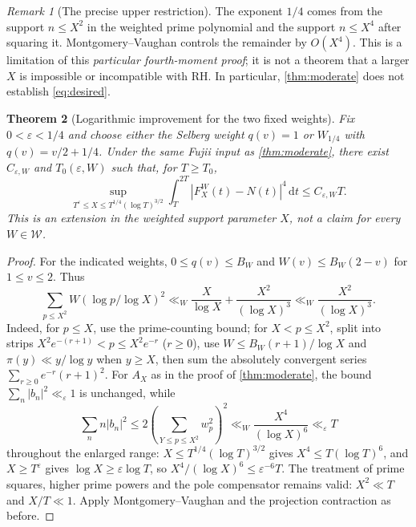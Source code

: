\documentclass[11pt,a4paper]{article}
\numberwithin{equation}{section}
\newtheorem{theorem}{Theorem}[section]
\theoremstyle{definition}
\theoremstyle{remark}
\newtheorem{remark}[theorem]{Remark}
\newcommand{\dd}{\,\mathrm dt}
\begin{document}
\begin{remark}[The precise upper restriction]\label{rem:quarter}
The exponent $1/4$ comes from the support $n\le X^2$ in the weighted prime polynomial and the support $n\le X^4$ after squaring it. Montgomery--Vaughan controls the remainder by $O(X^4)$. This is a limitation of this \emph{particular fourth-moment proof}; it is not a theorem that a larger $X$ is impossible or incompatible with RH. In particular, \cref{thm:moderate} does not establish \eqref{eq:desired}.
\end{remark}

\begin{theorem}[Logarithmic improvement for the two fixed weights]\label{thm:moderate-log}
Fix $0<\varepsilon<1/4$ and choose either the Selberg weight $q(v)=1$
or $W_{1/4}$ with $q(v)=v/2+1/4$. Under the same Fujii input as
\cref{thm:moderate}, there exist $C_{\varepsilon,W}$ and $T_0(\varepsilon,W)$ such that, for $T\ge T_0$,
\begin{equation}\label{eq:moderate-log}
\sup_{T^\varepsilon\le X\le T^{1/4}(\log T)^{3/2}}
\int_T^{2T}|F_X^W(t)-N(t)|^4\dd\le C_{\varepsilon,W}T.
\end{equation}
This is an extension in the \emph{weighted support parameter} $X$,
not a claim for every $W\in\mathcal W$.
\end{theorem}
\begin{proof}
For the indicated weights, $0\le q(v)\le B_W$ and
$W(v)\le B_W(2-v)$ for $1\le v\le2$. Thus
\begin{equation}\label{eq:wprime2}
\sum_{p\le X^2}W(\log p/\log X)^2
\ll_W\frac{X}{\log X}+\frac{X^2}{(\log X)^3}
\ll_W\frac{X^2}{(\log X)^3}.
\end{equation}
Indeed, for $p\le X$, use the prime-counting bound;
for $X<p\le X^2$, split into strips
$X^2e^{-(r+1)}<p\le X^2e^{-r}$ ($r\ge0$),
use $W\le B_W(r+1)/\log X$ and
$\pi(y)\ll y/\log y$ when $y\ge X$,
then sum the absolutely convergent series
$\sum_{r\ge0}e^{-r}(r+1)^2$.
For $A_X$ as in the proof of \cref{thm:moderate}, the bound
$\sum_n|b_n|^2\ll_\varepsilon1$ is unchanged, while
\begin{equation}
\sum_n n|b_n|^2
\le2\left(\sum_{Y\le p\le X^2} w_p^2\right)^2
\ll_W\frac{X^4}{(\log X)^6}\ll_\varepsilon T
\end{equation}
throughout the enlarged range: $X\le T^{1/4}(\log T)^{3/2}$ gives $X^4\le T(\log T)^6$, and $X\ge T^\varepsilon$ gives $\log X\ge\varepsilon\log T$, so $X^4/(\log X)^6\le\varepsilon^{-6}T$. The treatment of prime squares,
higher prime powers and the pole compensator remains valid:
$X^2\ll T$ and $X/T\ll1$. Apply Montgomery--Vaughan and the
projection contraction as before.\end{proof}
\end{document}
